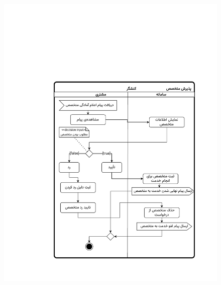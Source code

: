 \begin{figure}[ht!]
	\centering
	\includegraphics[scale=0.8, page=1]{figs/OOD-activity-acceptspec.pdf}
\end{figure}
\FloatBarrier
\newpage

